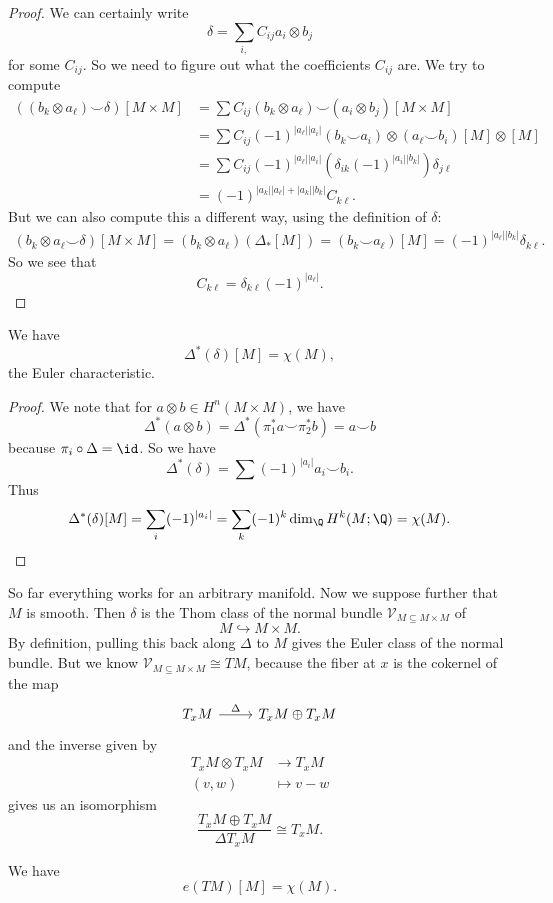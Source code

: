 \documentclass[a4paper]{article}
\begin{document}
\begin{proof}
  We can certainly write
  \[
    \delta = \sum_{i, } C_{ij} a_i \otimes b_j
  \]
  for some $C_{ij}$. So we need to figure out what the coefficients $C_{ij}$ are. We try to compute
  \begin{align*}
    ((b_k \otimes a_\ell) \smile \delta)[M \times M] &= \sum C_{ij} (b_k \otimes a_\ell) \smile (a_i \otimes b_j) [M \times M]\\
    &= \sum C_{ij} (-1)^{|a_\ell||a_i|} (b_k \smile a_i) \otimes (a_\ell \smile b_i) [M] \otimes [M]\\
    &= \sum C_{ij} (-1)^{|a_\ell||a_i|} (\delta_{ik}(-1)^{|a_i||b_k|}) \delta_{j \ell}\\
    &= (-1)^{|a_k||a_\ell| + |a_k| |b_k|} C_{k\ell}.
  \end{align*}
  But we can also compute this a different way, using the definition of $\delta$:
  \begin{align*}
    (b_k \otimes a_\ell \smile \delta)[M \times M] = (b_k \otimes a_\ell)(\Delta_*[M]) = (b_k \smile a_\ell)[M] = (-1)^{|a_\ell||b_k|} \delta_{k\ell}.
  \end{align*}
  So we see that
  \[
    C_{k\ell} = \delta_{k\ell}(-1)^{|a_\ell|}.
  \]
\end{proof}

\begin{cor}
  We have
  \[
    \Delta^*(\delta)[M] = \chi(M),
  \]
  the Euler characteristic.
\end{cor}

\begin{proof}
  We note that for $a \otimes b \in H^n(M \times M)$, we have
  \[
    \Delta^*(a \otimes b) = \Delta^*(\pi_1^* a \smile \pi_2^* b) = a \smile b
  \]
  because $\pi_i \circ \Delta = \id$. So we have
  \[
    \Delta^*(\delta) = \sum (-1)^{|a_i|} a_i \smile b_i.
  \]
  Thus
  \[
    \Delta^*(\delta)[M] = \sum_i (-1)^{|a_i|} = \sum_k (-1)^k \dim_\Q H^k(M; \Q) = \chi(M).
  \]
\end{proof}

So far everything works for an arbitrary manifold. Now we suppose further that $M$ is smooth. Then $\delta$ is the Thom class of the normal bundle $\mathcal{V}_{M \subseteq M \times M}$ of %
\[
  M \hookrightarrow M \times M.
\]
By definition, pulling this back along $\Delta$ to $M$ gives the Euler class of the normal bundle. But we know $\mathcal{V}_{M \subseteq M \times M} \cong TM$, because the fiber at $x$ is the cokernel of the map
\[
  \begin{tikzcd}
    T_x M \ar[r, "\Delta"] & T_x M \oplus T_x M
  \end{tikzcd}
\]
and the inverse given by
\begin{align*}
  T_x M \otimes T_x M &\to T_x M\\
  (v, w) &\mapsto v - w
\end{align*}
gives us an isomorphism
\[
  \frac{T_x M \oplus T_x M}{\Delta T_x M} \cong T_x M.
\]
\begin{cor}
  We have
  \[
    e(TM)[M] = \chi(M).
  \]
\end{cor}
\end{document}
